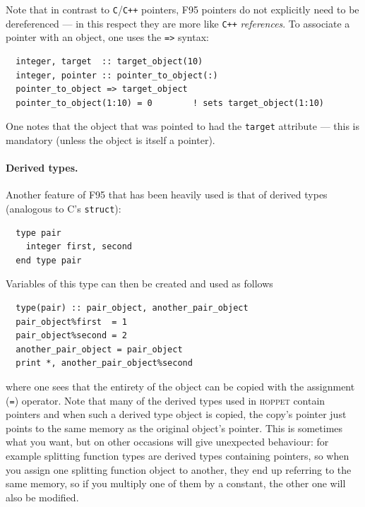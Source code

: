 \documentclass[12pt]{article}
\newcommand{\hoppet}{\textsc{hoppet}\xspace}
\newcommand{\ttt}[1]{\texttt{#1}}
\begin{document}
Note that in contrast to \ttt{C}/\ttt{C++} pointers, F95 pointers do
not explicitly need to be dereferenced --- in this respect they are
more like \ttt{C++} \emph{references}. To associate a pointer with an
object, one uses the \ttt{=>} syntax:
\begin{lstlisting}
  integer, target  :: target_object(10)
  integer, pointer :: pointer_to_object(:)
  pointer_to_object => target_object
  pointer_to_object(1:10) = 0        ! sets target_object(1:10)
\end{lstlisting}
One notes that the object that was pointed to had the \ttt{target}
attribute --- this is mandatory (unless the object is itself a
pointer).


\paragraph{Derived types.} Another feature of F95 that has been
heavily used is that of derived types (analogous to C's
\texttt{struct}):
\begin{lstlisting}
  type pair
    integer first, second
  end type pair 
\end{lstlisting}
Variables of this type can then be created and used as follows
\begin{lstlisting}
  type(pair) :: pair_object, another_pair_object
  pair_object%first  = 1
  pair_object%second = 2
  another_pair_object = pair_object
  print *, another_pair_object%second
\end{lstlisting}
where one sees that the entirety of the object can be copied with the
assignment (\texttt{=}) operator. Note that many of the derived types
used in \hoppet contain pointers and when such a derived type object
is copied, the copy's pointer just points to the same memory as the
original object's pointer. This is sometimes what you want, but on
other occasions will give unexpected behaviour: for example splitting
function types are derived types containing pointers, so when you
assign one splitting function object to another, they end up referring
to the same memory, so if you multiply one of them by a constant, the
other one will also be modified.
\end{document}
